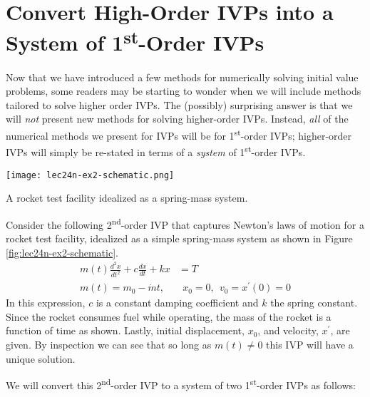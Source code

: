 \section{Convert High-Order IVPs into a System of 1\textsuperscript{st}-Order IVPs}
Now that we have introduced a few methods for numerically solving initial value problems, some readers may be starting to wonder when we will include methods tailored to solve higher order IVPs.  The (possibly) surprising answer is that we will \emph{not} present new methods for solving higher-order IVPs.  Instead, \emph{all} of the numerical methods we present for IVPs will be for 1\textsuperscript{st}-order IVPs; higher-order IVPs will simply be re-stated in terms of a \emph{system} of 1\textsuperscript{st}-order IVPs.
\begin{marginfigure}
\texttt{[image: lec24n-ex2-schematic.png]}
\caption{A rocket test facility idealized as a spring-mass system.}
\label{fig:lec24n-ex2-schematic}
\end{marginfigure}
Consider the following 2\textsuperscript{nd}-order IVP that captures Newton's laws of motion for a rocket test facility, idealized as a simple spring-mass system as shown in Figure \ref{fig:lec24n-ex2-schematic}.
\begin{align*}
m(t)\frac{d^2x}{dt^2}+c\frac{dx}{dt} + kx &= T \\
m(t) = m_0-\dot{m}t, & \ \ x_0 = 0, \ \ v_0 = x^{\prime}(0) = 0
\end{align*}
In this expression, $c$ is a constant damping coefficient and $k$ the spring constant.  Since the rocket consumes fuel while operating, the mass of the rocket is a function of time as shown.  Lastly, initial displacement, $x_0$, and velocity, $x^{\prime}$, are given. By inspection we can see that so long as $m(t) \ne 0$ this IVP will have a unique solution. 

\noindent We will convert this 2\textsuperscript{nd}-order IVP to a system of two 1\textsuperscript{st}-order IVPs as follows:


